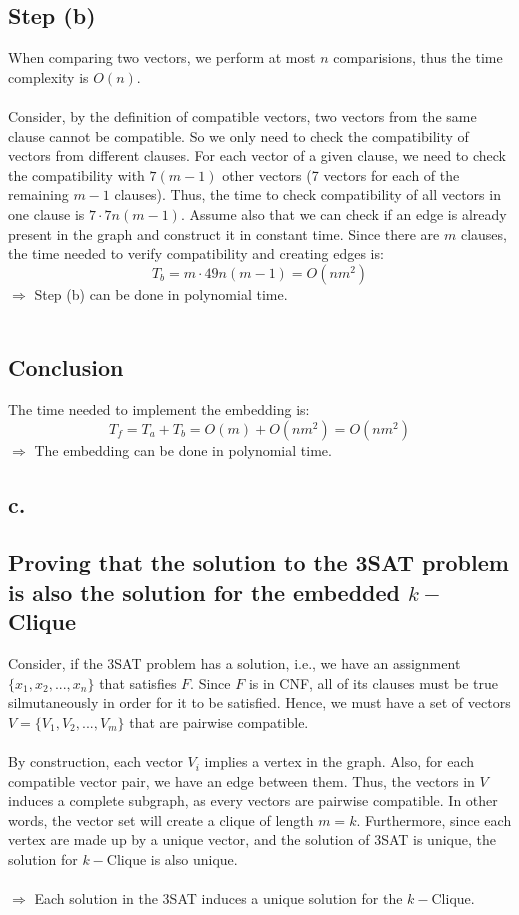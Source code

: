 \documentclass{article}
\begin{document}
\subsection*{Step (b)}
When comparing two vectors, we perform at most $n$ comparisions, thus the time complexity is $O(n)$. \\\\
Consider, by the definition of compatible vectors, two vectors from the same clause cannot be compatible. So we only need to check the compatibility of vectors from different clauses. For each vector of a given clause, we need to check the compatibility with $7(m-1)$ other vectors (7 vectors for each of the remaining $m-1$ clauses). Thus, the time to check compatibility of all vectors in one clause is $7 \cdot 7n(m-1)$. Assume also that we can check if an edge is already present in the graph and construct it in constant time. Since there are $m$ clauses, the time needed to verify compatibility and creating edges is:
\[
T_b = m \cdot 49n(m-1) = O(nm^2)
\]
$\Rightarrow$ Step (b) can be done in polynomial time. \\\\
\subsection*{Conclusion}
The time needed to implement the embedding is:
\[
T_f = T_a + T_b = O(m) + O(nm^2) = O(nm^2)
\]
$\Longrightarrow$ The embedding can be done in polynomial time.
\pagebreak
\subsection*{c.}
\subsection*{Proving that the solution to the 3SAT problem is also the solution for the embedded $k-$Clique}
Consider, if the 3SAT problem has a solution, i.e., we have an assignment $\{x_1, x_2, ..., x_n\}$ that satisfies $F$. Since $F$ is in CNF, all of its clauses must be true silmutaneously in order for it to be satisfied. Hence, we must have a set of vectors $V = \{V_1, V_2, ..., V_m\}$ that are pairwise compatible. \\\\
By construction, each vector $V_i$ implies a vertex in the graph. Also, for each compatible vector pair, we have an edge between them. Thus, the vectors in $V$ induces a complete subgraph, as every vectors are pairwise compatible. In other words, the vector set will create a clique of length $m=k$. Furthermore, since each vertex are made up by a unique vector, and the solution of 3SAT is unique, the solution for $k-$Clique is also unique.\\\\
$\Rightarrow$ Each solution in the 3SAT induces a unique solution for the $k-$Clique.\\\\
\end{document}
